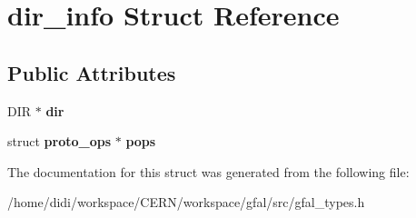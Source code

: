 \section{dir\_\-info Struct Reference}
\label{structdir__info}
\subsection*{Public Attributes}
\begin{DoxyCompactItemize}
\item 
DIR $\ast$ {\bfseries dir}\label{structdir__info_a5efa7d4ff43e1aa8e8dcc27d13416779}

\item 
struct {\bf proto\_\-ops} $\ast$ {\bfseries pops}\label{structdir__info_a72a8056b4a3df36e3767cabb2c942ede}

\end{DoxyCompactItemize}


The documentation for this struct was generated from the following file:\begin{DoxyCompactItemize}
\item 
/home/didi/workspace/CERN/workspace/gfal/src/gfal\_\-types.h\end{DoxyCompactItemize}
